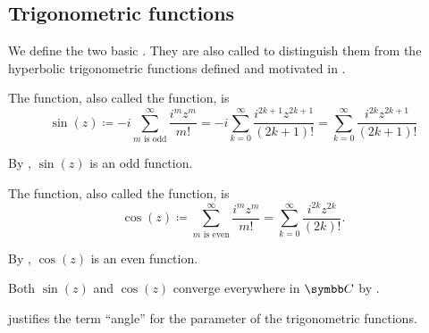 \subsection{Trigonometric functions}\label{subsec:trigonometric_functions}

\begin{definition}\label{def:trigonometric_functions}
  We define the two basic . They are also called  to distinguish them from the hyperbolic trigonometric functions defined and motivated in .

  \begin{defenum}
     The  function, also called the  function, is
    \begin{equation*}
      \sin(z)
      \coloneqq
      -i \sum_{m \text{ is odd}}^\infty \frac {i^m z^m} {m!}
      =
      -i \sum_{k=0}^\infty \frac {i^{2k+1} z^{2k+1}} {(2k + 1)!}
      =
      \sum_{k=0}^\infty \frac {i^{2k} z^{2k+1}} {(2k + 1)!}
    \end{equation*}

    By , \( \sin(z) \) is an odd function.

     The  function, also called the  function, is
    \begin{equation*}
      \cos(z)
      \coloneqq
      \sum_{m \text{ is even}}^\infty \frac {i^m z^m} {m!}
      =
      \sum_{k=0}^\infty \frac {i^{2k} z^{2k}} {(2k)!}.
    \end{equation*}

    By , \( \cos(z) \) is an even function.
  \end{defenum}

  Both \( \sin(z) \) and \( \cos(z) \) converge everywhere in \( \BC \) by .

   justifies the term \enquote{angle} for the parameter of the trigonometric functions.
\end{definition}

